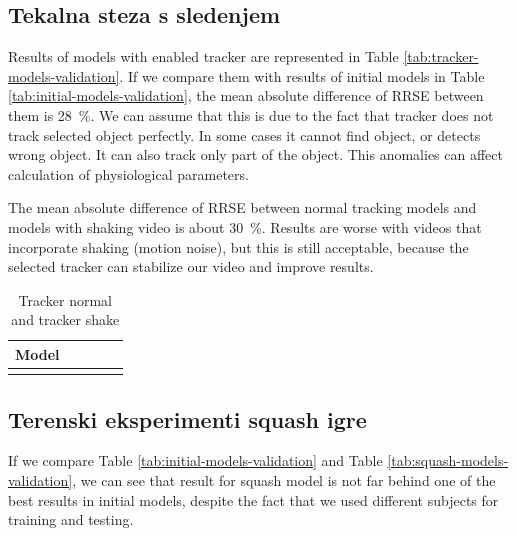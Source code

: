 \subsection{Tekalna steza s sledenjem}
Results of models with enabled tracker are represented in Table \ref{tab:tracker-models-validation}. If we compare them with results of initial models in Table \ref{tab:initial-models-validation}, the mean absolute difference of RRSE between them is \SI{28}{\%}. We can assume that this is due to the fact that tracker does not track selected object perfectly. In some cases it cannot find object, or detects wrong object. It can also track only part of the object. This anomalies can affect calculation of physiological parameters.



The mean absolute difference of RRSE between normal tracking models and models with shaking video is about \SI{30}{\%}. Results are worse with videos that incorporate shaking (motion noise), but this is still acceptable, because the selected tracker can stabilize our video and improve results.



\begin{table}[!htbp]
	\centering
	\begin{tabular}{l S[table-format=1.2, round-mode=places, round-precision=2] S[table-format=1.2, round-mode=places, round-precision=2] S[table-format=1.2, round-mode=places, round-precision=2] S[table-format=1.2, round-mode=places, round-precision=2]}
		\toprule
		\textbf{Model} &  &  &  &  \\
		\midrule
		\bottomrule
	\end{tabular}
	\caption{Tracker normal and tracker shake}
	\label{tab:shake}
\end{table}












\subsection{Terenski eksperimenti squash igre}
If we compare Table \ref{tab:initial-models-validation} and Table \ref{tab:squash-models-validation}, we can see that result for squash model is not far behind one of the best results in initial models, despite the fact that we used different subjects for training and testing. 

